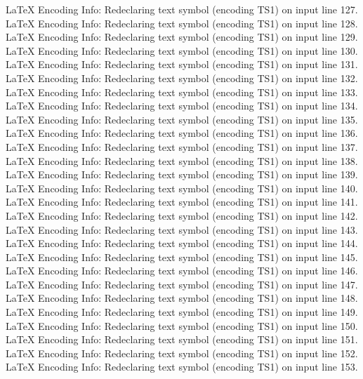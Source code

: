 LaTeX Encoding Info:    Redeclaring text symbol \texttildelow (encoding TS1) on input line 127.
LaTeX Encoding Info:    Redeclaring text symbol \textdblhyphenchar (encoding TS1) on input line 128.
LaTeX Encoding Info:    Redeclaring text symbol \textasciibreve (encoding TS1) on input line 129.
LaTeX Encoding Info:    Redeclaring text symbol \textasciicaron (encoding TS1) on input line 130.
LaTeX Encoding Info:    Redeclaring text symbol \textacutedbl (encoding TS1) on input line 131.
LaTeX Encoding Info:    Redeclaring text symbol \textgravedbl (encoding TS1) on input line 132.
LaTeX Encoding Info:    Redeclaring text symbol \textdagger (encoding TS1) on input line 133.
LaTeX Encoding Info:    Redeclaring text symbol \textdaggerdbl (encoding TS1) on input line 134.
LaTeX Encoding Info:    Redeclaring text symbol \textbardbl (encoding TS1) on input line 135.
LaTeX Encoding Info:    Redeclaring text symbol \textperthousand (encoding TS1) on input line 136.
LaTeX Encoding Info:    Redeclaring text symbol \textbullet (encoding TS1) on input line 137.
LaTeX Encoding Info:    Redeclaring text symbol \textcelsius (encoding TS1) on input line 138.
LaTeX Encoding Info:    Redeclaring text symbol \textdollaroldstyle (encoding TS1) on input line 139.
LaTeX Encoding Info:    Redeclaring text symbol \textcentoldstyle (encoding TS1) on input line 140.
LaTeX Encoding Info:    Redeclaring text symbol \textflorin (encoding TS1) on input line 141.
LaTeX Encoding Info:    Redeclaring text symbol \textcolonmonetary (encoding TS1) on input line 142.
LaTeX Encoding Info:    Redeclaring text symbol \textwon (encoding TS1) on input line 143.
LaTeX Encoding Info:    Redeclaring text symbol \textnaira (encoding TS1) on input line 144.
LaTeX Encoding Info:    Redeclaring text symbol \textguarani (encoding TS1) on input line 145.
LaTeX Encoding Info:    Redeclaring text symbol \textpeso (encoding TS1) on input line 146.
LaTeX Encoding Info:    Redeclaring text symbol \textlira (encoding TS1) on input line 147.
LaTeX Encoding Info:    Redeclaring text symbol \textrecipe (encoding TS1) on input line 148.
LaTeX Encoding Info:    Redeclaring text symbol \textinterrobang (encoding TS1) on input line 149.
LaTeX Encoding Info:    Redeclaring text symbol \textinterrobangdown (encoding TS1) on input line 150.
LaTeX Encoding Info:    Redeclaring text symbol \textdong (encoding TS1) on input line 151.
LaTeX Encoding Info:    Redeclaring text symbol \texttrademark (encoding TS1) on input line 152.
LaTeX Encoding Info:    Redeclaring text symbol \textpertenthousand (encoding TS1) on input line 153.

